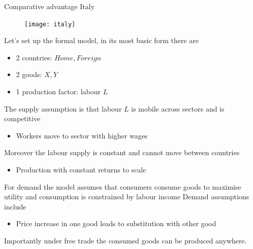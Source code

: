 \documentclass{beamer}
\begin{document}
\begin{frame}{Comparative advantage Italy}
  \begin{figure}
    \texttt{[image: italy]}
  \end{figure}  
\end{frame}

\begin{frame}
  Let's set up the formal model, in its most basic form there are
  \medskip
  \begin{itemize}
    \item 2 countries: $Home, Foreign$
    \item 2 goods: $X, Y$
    \item 1 production factor: labour $L$
  \end{itemize}
\end{frame}

\begin{frame}
  The supply assumption is that labour $L$ is mobile across sectors and is competitive
  \begin{itemize}
    \item Workers move to sector with higher wages
  \end{itemize}
  \medskip
  Moreover the labour supply is constant and cannot move between countries
  \begin{itemize}
    \item Production with constant returns to scale     
  \end{itemize}      
\end{frame}

\begin{frame}
  For demand the model assumes that consumers consume goods to maximise utility and consumption is constrained by labour income
  Demand assumptions include
  \medskip
  \begin{itemize}
    \item Price increase in one good leads to substitution with other good    
  \end{itemize}
  \medskip
  Importantly under free trade the consumed goods can be produced anywhere.
\end{frame}
\end{document}
